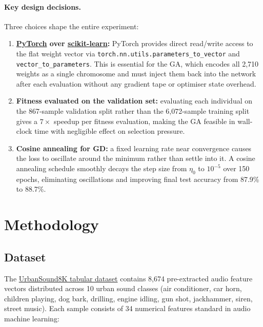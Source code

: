\documentclass[11pt,a4paper]{article}
\begin{document}
\paragraph{Key design decisions.}
Three choices shape the entire experiment:
\begin{enumerate}
    \item \textbf{\href{https://pytorch.org}{PyTorch} over \href{https://scikit-learn.org}{scikit-learn}:}
          PyTorch provides direct read/write access to the flat weight vector via
          \texttt{torch.nn.utils.parameters\_to\_vector} and \texttt{vector\_to\_parameters}.
          This is essential for the GA, which encodes all 2,710 weights as a single chromosome
          and must inject them back into the network after each evaluation without any gradient
          tape or optimiser state overhead.
    \item \textbf{Fitness evaluated on the validation set:} evaluating each individual on the
          867-sample validation split rather than the 6,072-sample training split gives a $7\times$
          speedup per fitness evaluation, making the GA feasible in wall-clock time with negligible
          effect on selection pressure.
    \item \textbf{Cosine annealing for GD:} a fixed learning rate near convergence causes the loss
          to oscillate around the minimum rather than settle into it. A cosine annealing schedule
          smoothly decays the step size from $\eta_0$ to $10^{-5}$ over 150 epochs, eliminating
          oscillations and improving final test accuracy from 87.9\% to 88.7\%.
\end{enumerate}

\section{Methodology}

\subsection{Dataset}

The \href{https://www.kaggle.com/datasets/orvile/urban-sound-8k-tabular-form}{UrbanSound8K tabular
dataset} contains 8,674 pre-extracted audio feature vectors distributed across 10 urban sound
classes (air conditioner, car horn, children playing, dog bark, drilling, engine idling, gun shot,
jackhammer, siren, street music). Each sample consists of 34 numerical features standard in audio
machine learning:
\end{document}

